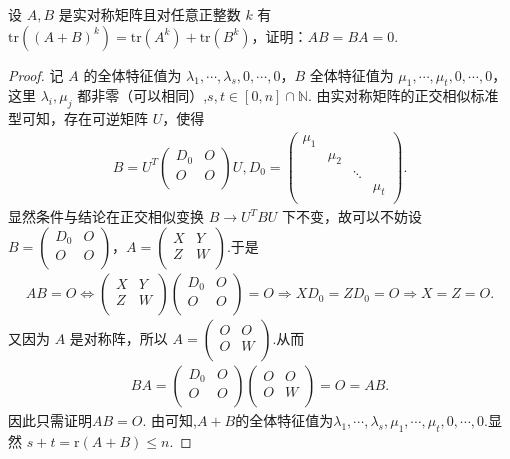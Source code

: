 \documentclass[../../main.tex]{subfiles}
\begin{document}
\begin{example}\label{example:例题611}
设 $A,B$ 是实对称矩阵且对任意正整数 $k$ 有 $\mathrm{tr}\left( \left( A+B \right) ^k \right) =\mathrm{tr}\left( A^k \right) +\mathrm{tr}\left( B^k \right) $，证明：$AB=BA=0$.
\end{example}
\begin{proof}
记 $A$ 的全体特征值为 $\lambda_1,\cdots,\lambda_s,0,\cdots,0$，$B$ 全体特征值为 $\mu_1,\cdots,\mu_t,0,\cdots,0$，这里 $\lambda_i,\mu_j$ 都非零（可以相同）,$s,t\in[0,n]\cap \mathbb{N}$.
由实对称矩阵的正交相似标准型可知，存在可逆矩阵 $U$，使得
\begin{align*}
B=U^T\begin{pmatrix}
D_0&		O\\
O&		O\\
\end{pmatrix} U,D_0=\begin{pmatrix}
\mu _1&		&		&		\\
&		\mu _2&		&		\\
&		&		\ddots&		\\
&		&		&		\mu _t\\
\end{pmatrix}.
\end{align*}
显然条件与结论在正交相似变换 $B\rightarrow U^TBU$ 下不变，故可以不妨设 $B=\begin{pmatrix}
D_0&		O\\
O&		O\\
\end{pmatrix}$，$A=\begin{pmatrix}
X&		Y\\
Z&		W\\
\end{pmatrix}$.于是
\begin{align*}
AB=O\Longleftrightarrow \begin{pmatrix}
X&		Y\\
Z&		W\\
\end{pmatrix} \begin{pmatrix}
D_0&		O\\
O&		O\\
\end{pmatrix} =O\Rightarrow XD_0=ZD_0=O\Rightarrow X=Z=O.
\end{align*}
又因为 $A$ 是对称阵，所以 $A=\begin{pmatrix}
O&		O\\
O&		W\\
\end{pmatrix}$.从而
\begin{align*}
BA = \begin{pmatrix}
D_0&		O\\
O&		O\\
\end{pmatrix}\begin{pmatrix}
O&		O\\
O&		W\\
\end{pmatrix} = O = AB.
\end{align*}
因此只需证明$AB=O$.
由可知,$A+B$的全体特征值为$\lambda _1,\cdots ,\lambda _s,\mu _1,\cdots ,\mu _t,0,\cdots ,0.$显然 $s+t=\mathrm{r}\left( A+B \right) \leqslant n$.


\end{proof}
\end{document}

